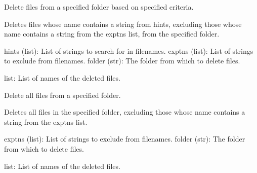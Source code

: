 \documentclass[letterpaper,10pt,english]{sphinxmanual}
\begin{document}
\begin{fulllineitems}
\label{\detokenize{autoapi/unduwave/helpers/file_folder_helpers/index:unduwave.helpers.file_folder_helpers.del_files}}
\pysigstartsignatures
{}
\pysigstopsignatures
\sphinxAtStartPar
Delete files from a specified folder based on specified criteria.

\sphinxAtStartPar
Deletes files whose name contains a string from hints,
excluding those whose name contains a string from the exptns list,
from the specified folder.
\begin{description}
\sphinxAtStartPar
hints (list): List of strings to search for in filenames.
exptns (list): List of strings to exclude from filenames.
folder (str): The folder from which to delete files.

\sphinxAtStartPar
list: List of names of the deleted files.

\end{description}

\end{fulllineitems}


\begin{fulllineitems}
\label{\detokenize{autoapi/unduwave/helpers/file_folder_helpers/index:unduwave.helpers.file_folder_helpers.del_all_files}}
\pysigstartsignatures
{}
\pysigstopsignatures
\sphinxAtStartPar
Delete all files from a specified folder.

\sphinxAtStartPar
Deletes all files in the specified folder, excluding those whose name
contains a string from the exptns list.
\begin{description}
\sphinxAtStartPar
exptns (list): List of strings to exclude from filenames.
folder (str): The folder from which to delete files.

\sphinxAtStartPar
list: List of names of the deleted files.

\end{description}

\end{fulllineitems}
\end{document}
